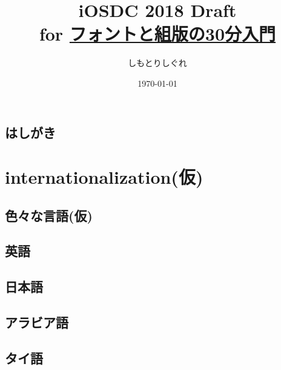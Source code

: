 \documentclass[10pt,twoside,openright,dvipdfmx]{jsbook}
\title{%
    iOSDC 2018 Draft \\
    \large for \href{https://fortee.jp/iosdc-japan-2018/proposal/8e9e8e22-8ff1-4381-813a-347475c2606f}{フォントと組版の30分入門}}
\author[$\dagger$]{しもとりしぐれ}
\affil[$\dagger$]{@S\_Shimotori}
\date{\today}
\newcommand\blankpage{%
    \null
    \thispagestyle{empty}
    \addtocounter{page}{-1}
    \newpage
}
\begin{document}
\maketitle
\restoregeometry

\afterpage{\blankpage}


\tableofcontents
\thispagestyle{plain}

\chapter*{はしがき}
\thispagestyle{plain}


\cleardoublepage



\part{internationalization(仮)}\label{part:internationalization}
\restoregeometry

\chapter{色々な言語(仮)}\label{chapter:internationalization/languages}
\thispagestyle{plain}

\chapter{英語}\label{chapter:internationalization/languages/english}

\chapter{日本語}\label{chapter:internationalization/languages/japanese}

\chapter{アラビア語}\label{chapter:internationalization/languages/arabic}

\chapter{タイ語}\label{chapter:internationalization/languages/thai}

\end{document}
